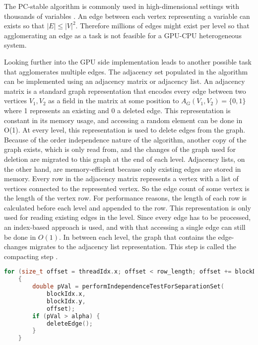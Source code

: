 The PC-stable algorithm is commonly used in high-dimensional settings with thousands of variables \cite{nagarajanFunctionalRelationshipsGenes2010}. An edge between each vertex representing a variable can exists so that $|E| \leq |V|^{2}$. Therefore millions of edges might exist per level so that agglomerating an edge as a task is not feasible for a GPU-CPU heterogeneous system.

Looking further into the GPU side implementation leads to another possible task that agglomerates multiple edges. The adjacency set populated in the algorithm can be implemented using an adjacency matrix or adjacency list. An adjacency matrix is a standard graph representation that encodes every edge between two vertices $V_1, V_2$ as a field in the matrix at some position to $A_G(V_1, V_2) = \{0,1\}$ where 1 represents an existing and 0 a deleted edge. This representation is constant in its memory usage, and accessing a random element can be done in O(1). At every level, this representation is used to delete edges from the graph. Because of the order independence nature of the algorithm, another copy of the graph exists, which is only read from, and the changes of the graph used for deletion are migrated to this graph at the end of each level.
Adjacency lists, on the other hand, are memory-efficient because only existing edges are stored in memory. Every row in the adjacency matrix represents a vertex with a list of vertices connected to the represented vertex. So the edge count of some vertex is the length of the vertex row. For performance reasons, the length of each row is calculated before each level and appended to the row. This representation is only used for reading existing edges in the level. Since every edge has to be processed, an index-based approach is used, and with that accessing a single edge can still be done in $O(1)$.
In between each level, the graph that contains the edge-changes migrates to the adjacency list representation. This step is called the compacting step \cite{zarebavaniCuPCCUDAbasedParallel2018}.

\begin{lstlisting}[language=C++, caption=Basic separation set loop in level 1, label=lst:sepsetloopl1]
    for (size_t offset = threadIdx.x; offset < row_length; offset += blockDim.x)
    {
        double pVal = performIndependenceTestForSeparationSet(
            blockIdx.x,
            blockIdx.y,
            offset);
        if (pVal > alpha) {
            deleteEdge();
        }
    }
\end{lstlisting}

